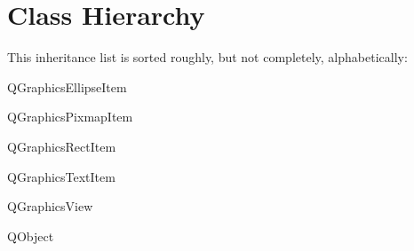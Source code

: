 \section{Class Hierarchy}
This inheritance list is sorted roughly, but not completely, alphabetically\+:\begin{DoxyCompactList}
\item Q\+Graphics\+Ellipse\+Item\begin{DoxyCompactList}
\item {}
\end{DoxyCompactList}
\item Q\+Graphics\+Pixmap\+Item\begin{DoxyCompactList}
\item {}
\item {}
\end{DoxyCompactList}
\item Q\+Graphics\+Rect\+Item\begin{DoxyCompactList}
\item {}
\end{DoxyCompactList}
\item Q\+Graphics\+Text\+Item\begin{DoxyCompactList}
\item {}
\item {}
\end{DoxyCompactList}
\item Q\+Graphics\+View\begin{DoxyCompactList}
\item {}
\end{DoxyCompactList}
\item Q\+Object\begin{DoxyCompactList}
\item {}
\item {}
\item {}
\item {}
\end{DoxyCompactList}
\end{DoxyCompactList}
